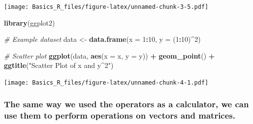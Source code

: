 \documentclass[
]{article}
\newenvironment{Shaded}{\begin{snugshade}}{\end{snugshade}}
\newcommand{\CommentTok}[1]{\textcolor[rgb]{0.56,0.35,0.01}{\textit{#1}}}
\newcommand{\DataTypeTok}[1]{\textcolor[rgb]{0.13,0.29,0.53}{#1}}
\newcommand{\DecValTok}[1]{\textcolor[rgb]{0.00,0.00,0.81}{#1}}
\newcommand{\KeywordTok}[1]{\textcolor[rgb]{0.13,0.29,0.53}{\textbf{#1}}}
\newcommand{\NormalTok}[1]{#1}
\newcommand{\OperatorTok}[1]{\textcolor[rgb]{0.81,0.36,0.00}{\textbf{#1}}}
\newcommand{\StringTok}[1]{\textcolor[rgb]{0.31,0.60,0.02}{#1}}
\begin{document}
\texttt{[image: Basics\_R\_files/figure-latex/unnamed-chunk-3-5.pdf]}

\begin{Shaded}
\begin{Highlighting}[]
\KeywordTok{library}\NormalTok{(ggplot2)}

\CommentTok{# Example dataset}
\NormalTok{data <-}\StringTok{ }\KeywordTok{data.frame}\NormalTok{(}\DataTypeTok{x =} \DecValTok{1}\OperatorTok{:}\DecValTok{10}\NormalTok{, }\DataTypeTok{y =}\NormalTok{ (}\DecValTok{1}\OperatorTok{:}\DecValTok{10}\NormalTok{)}\OperatorTok{^}\DecValTok{2}\NormalTok{)}

\CommentTok{# Scatter plot}
\KeywordTok{ggplot}\NormalTok{(data, }\KeywordTok{aes}\NormalTok{(}\DataTypeTok{x =}\NormalTok{ x, }\DataTypeTok{y =}\NormalTok{ y)) }\OperatorTok{+}
\StringTok{  }\KeywordTok{geom_point}\NormalTok{() }\OperatorTok{+}
\StringTok{  }\KeywordTok{ggtitle}\NormalTok{(}\StringTok{"Scatter Plot of x and y^2"}\NormalTok{)}
\end{Highlighting}
\end{Shaded}

\texttt{[image: Basics\_R\_files/figure-latex/unnamed-chunk-4-1.pdf]}

\hypertarget{the-same-way-we-used-the-operators-as-a-calculator-we-can-use-them-to-perform-operations-on-vectors-and-matrices.}{%
\subsubsection{The same way we used the operators as a calculator, we
can use them to perform operations on vectors and
matrices.}\label{the-same-way-we-used-the-operators-as-a-calculator-we-can-use-them-to-perform-operations-on-vectors-and-matrices.}}
\end{document}
